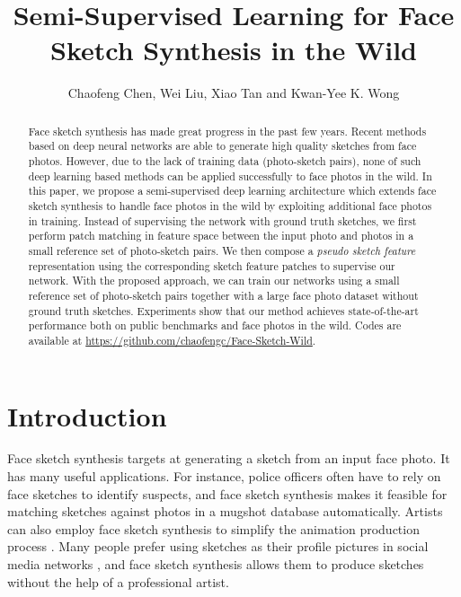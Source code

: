 \documentclass[runningheads]{llncs}
\def \etal {{\em et~al.}}
\begin{document}
\pagestyle{headings}
\mainmatter

\def\ACCV18SubNumber{29}  

\title{Semi-Supervised Learning for Face Sketch Synthesis in the Wild} 
\authorrunning{Chen \etal}

\author{Chaofeng Chen, Wei Liu, Xiao Tan and Kwan-Yee K. Wong}
\maketitle

\begin{abstract}
Face sketch synthesis has made great progress in the past few years. Recent methods based on deep neural networks are able to generate high quality sketches from face photos. However, due to the lack of training data (photo-sketch pairs), none of such deep learning based methods can be applied successfully to face photos in the wild. In this paper, we propose a semi-supervised deep learning architecture which extends face sketch synthesis to handle face photos in the wild by exploiting additional face photos in training. Instead of supervising the network with ground truth sketches, we first perform patch matching in feature space between the input photo and photos in a small reference set of photo-sketch pairs. We then compose a {\em pseudo sketch feature} representation using the corresponding sketch feature patches to supervise our network. With the proposed approach, we can train our networks using a small reference set of photo-sketch pairs together with a large face photo dataset without ground truth sketches. Experiments show that our method achieves state-of-the-art performance both on public benchmarks and face photos in the wild. Codes are available at \url{https://github.com/chaofengc/Face-Sketch-Wild}.
\end{abstract}

\section{Introduction}\label{sec:intro}
Face sketch synthesis targets at generating a sketch from an input face photo. It has many useful applications. For instance, police officers often have to rely on face sketches to identify suspects, and face sketch synthesis makes it feasible for matching sketches against photos in a mugshot database automatically. Artists can also employ face sketch synthesis to simplify the animation production process \cite{song2014real}. Many people prefer using sketches as their profile pictures in social media networks \cite{berger2013style}, and face sketch synthesis allows them to produce sketches without the help of a professional artist.
\end{document}
